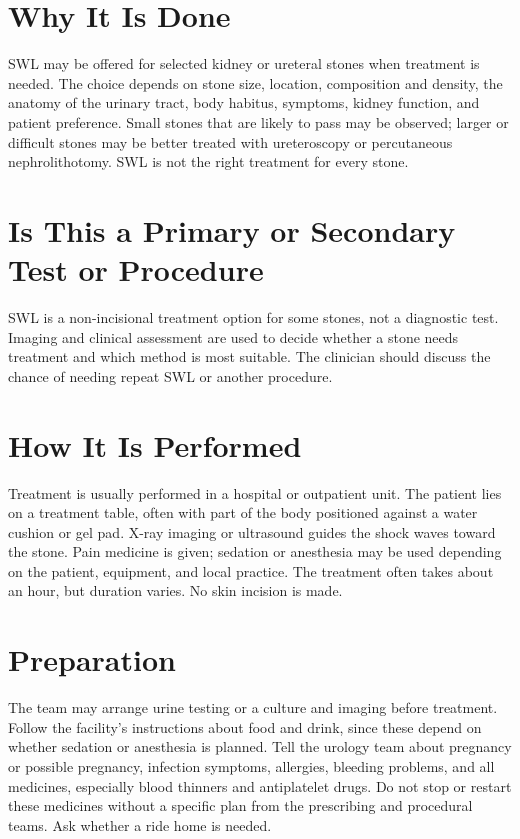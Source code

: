 \section*{Why It Is Done}
SWL may be offered for selected kidney or ureteral stones when treatment is needed. The choice depends on stone size, location, composition and density, the anatomy of the urinary tract, body habitus, symptoms, kidney function, and patient preference. Small stones that are likely to pass may be observed; larger or difficult stones may be better treated with ureteroscopy or percutaneous nephrolithotomy. SWL is not the right treatment for every stone.

\section*{Is This a Primary or Secondary Test or Procedure}
SWL is a non-incisional treatment option for some stones, not a diagnostic test. Imaging and clinical assessment are used to decide whether a stone needs treatment and which method is most suitable. The clinician should discuss the chance of needing repeat SWL or another procedure.

\section*{How It Is Performed}
Treatment is usually performed in a hospital or outpatient unit. The patient lies on a treatment table, often with part of the body positioned against a water cushion or gel pad. X-ray imaging or ultrasound guides the shock waves toward the stone. Pain medicine is given; sedation or anesthesia may be used depending on the patient, equipment, and local practice. The treatment often takes about an hour, but duration varies. No skin incision is made.

\section*{Preparation}
The team may arrange urine testing or a culture and imaging before treatment. Follow the facility's instructions about food and drink, since these depend on whether sedation or anesthesia is planned. Tell the urology team about pregnancy or possible pregnancy, infection symptoms, allergies, bleeding problems, and all medicines, especially blood thinners and antiplatelet drugs. Do not stop or restart these medicines without a specific plan from the prescribing and procedural teams. Ask whether a ride home is needed.

